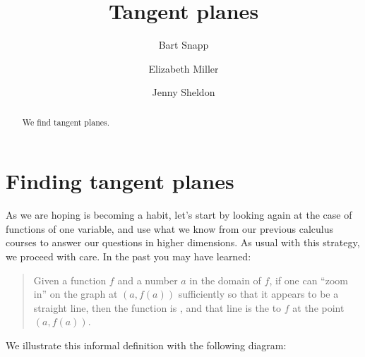 \documentclass{ximera}
\author{Bart Snapp \and Elizabeth Miller \and Jenny Sheldon}
\title[Dig-In:]{Tangent planes}
\begin{document}
\begin{abstract}
  We find tangent planes.
\end{abstract}
\maketitle

\section{Finding tangent planes}


As we are hoping is becoming a habit, let's start by looking again at
the case of functions of one variable, and use what we know from our
previous calculus courses to answer our questions in higher
dimensions.  As usual with this strategy, we proceed with care.  In
the past you may have learned:
\begin{quote}
Given a function $f$ and a number $a$ in the domain of $f$, if one can
``zoom in'' on the graph at $(a, f(a))$ sufficiently so that it
appears to be a straight line, then the function is
, and that line is the  to
$f$ at the point $(a,f(a))$.
\end{quote}
We illustrate this informal definition with the following diagram:
\end{document}
